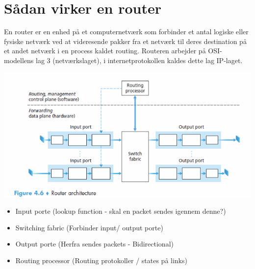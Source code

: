 {{\section{Sådan virker en router}
En router er en enhed på et computernetværk som forbinder et antal logiske eller fysiske netværk ved at videresende pakker fra et netværk til deres destination på et andet netværk i en process kaldet routing. Routeren arbejder på OSI-modellens lag 3 (netværkslaget), i internetprotokollen kaldes dette lag IP-laget.
\begin{center}
  \includegraphics[scale=0.8]{4-network-layer/whats-inside-a-router.png}
\end{center}
\begin{itemize}
	\item Input porte (lookup function - skal en packet sendes igennem denne?)
	\item Switching fabric (Forbinder input/ output porte)
	\item Output porte (Herfra sendes packets - Bidirectional) 
	\item Routing processor (Routing protokoller / states på links)
\end{itemize}


}}
